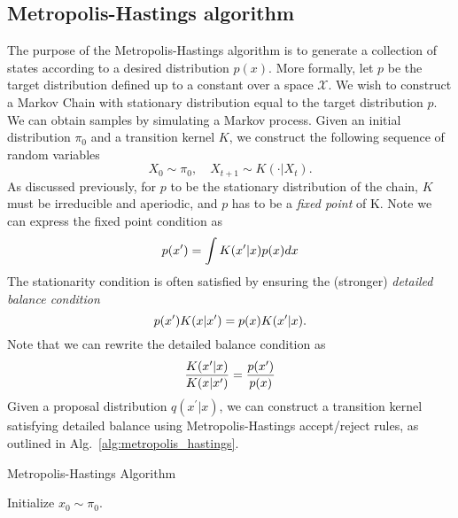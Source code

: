 \documentclass[../main.tex]{subfiles}
\begin{document}
\subsection{Metropolis-Hastings algorithm}
The purpose of the Metropolis-Hastings algorithm is to generate a collection of states according to a desired
distribution $p(x)$.
%
More formally, let $p$ be the target distribution defined up to a constant over a space $\mathcal{X}$.
%
We wish to construct a Markov Chain with stationary distribution equal to the target distribution $p$.
%
We can obtain samples by simulating a Markov process.
%
Given an initial distribution $\pi_0$ and a transition kernel $K$, we construct the following sequence of random
variables
%
\begin{equation}
  X_0 \sim \pi_0, \quad X_{t+1} \sim K(\cdot|X_t).
\end{equation}
%
As discussed previously, for $p$ to be the stationary distribution of the chain, $K$ must be irreducible and aperiodic,
and $p$ has to be a \emph{fixed point} of K. Note we can express the fixed point condition as 
%
\begin{equation}
  p({x^{\prime}}) = \int K({x^{\prime}} | x) p(x) dx
\end{equation}
%
The stationarity condition is often satisfied by ensuring the (stronger) \emph{detailed balance condition}
%
\begin{equation}
  p{({x^{\prime}})} K{(x|{x^{\prime}})} = p{(x)} K{({x^{\prime}}|x)}.
\end{equation}
%
Note that we can rewrite the detailed balance condition as 
%
\begin{equation}
  \frac{K{({x^{\prime}} | x)}}{K(x | {x^{\prime}})} = \frac{p({x^{\prime}})}{p(x)}
\end{equation}
%
Given a proposal distribution $q{(x^{\prime}|x)}$, we can construct a transition kernel satisfying detailed balance
using Metropolis-Hastings accept/reject rules, as outlined in Alg.~\ref{alg:metropolis_hastings}.
%
\begin{algorithm}[htpb]
  \AlgoDontDisplayBlockMarkers\SetAlgoNoEnd\SetAlgoNoLine%
  \DontPrintSemicolon%
  \caption{Metropolis-Hastings Algorithm}%
  \;
  Initialize $x_0 \sim \pi_0$.\;
\label{alg:metropolis_hastings}
\end{algorithm}
\end{document}
